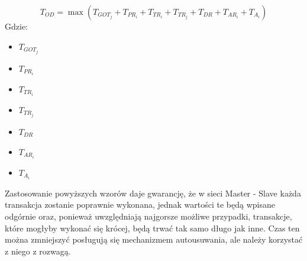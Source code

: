 \documentclass[a4paper,twoside]{article}
\begin{document}
	$$ T_{OD}=\max{(T_{GOT_j}+ T_{PR_i}+T_{TR_i}+T_{TR_j}+T_{DR}+T_{AR_i}+T_{A_i})} $$
	Gdzie:
	\begin{itemize}
		\item $ T_{GOT_j} $ 
		\item $ T_{PR_i} $ 
		\item $ T_{TR_i} $ 
		\item $ T_{TR_j} $ 
		\item $ T_{DR} $ 
		\item $ T_{AR_i} $ 
		\item $ T_{A_i} $ 
	\end{itemize}
	Zastosowanie powyższych wzorów daje gwarancję, że w sieci Master - Slave każda transakcja zostanie poprawnie wykonana, jednak wartości te będą wpisane odgórnie oraz, ponieważ uwzględniają najgorsze możliwe przypadki, transakcje, które mogłyby wykonać się krócej, będą trwać tak samo długo jak inne. Czas ten można zmniejszyć posługują się mechanizmem autousuwania, ale należy korzystać z niego z rozwagą.
\newpage
\end{document}

